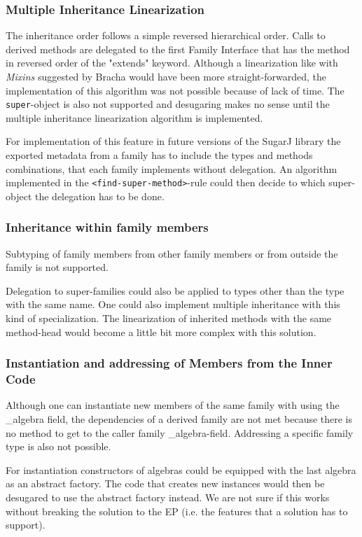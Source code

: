 \documentclass{report}
\begin{document}
\subsubsection*{Multiple Inheritance Linearization}

The inheritance order follows a simple reversed hierarchical order. Calls to derived methods are delegated to the first Family Interface that has the method in reversed order of the "extends" keyword. Although a linearization like with \emph{Mixins} suggested by Bracha \cite{Bracha-Mixin-1990} would have been more straight-forwarded, the implementation of this algorithm was not possible because of lack of time. The \lstinline{super}-object is also not supported and desugaring makes no sense until the multiple inheritance linearization algorithm is implemented.

For implementation of this feature in future versions of the SugarJ library the exported metadata from a family has to include the types and methods combinations, that each family implements without delegation. An algorithm implemented in the \lstinline{<find-super-method>}-rule could then decide to which super-object the delegation has to be done.

\subsubsection*{Inheritance within family members}

Subtyping of family members from other family members or from outside the family is not supported.

Delegation to super-families could also be applied to types other than the type with the same name. One could also implement multiple inheritance with this kind of specialization. The linearization of inherited methods with the same method-head would become a little bit more complex with this solution.

\subsubsection*{Instantiation and addressing of Members from the Inner Code}

Although one can instantiate new members of the same family with using the \_algebra field, the dependencies of a derived family are not met because there is no method to get to the caller family \_algebra-field.
Addressing a specific family type is also not possible.

For instantiation constructors of algebras could be equipped with the last algebra as an abstract factory. The code that creates new instances would then be desugared to use the abstract factory instead. We are not sure if this works without breaking the solution to the EP (i.e. the features that a solution has to support).
\end{document}
